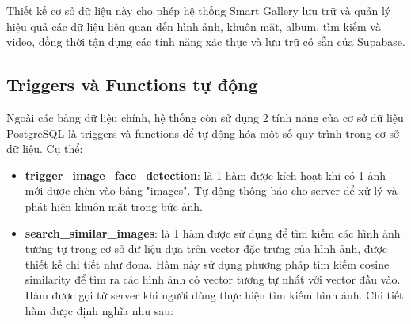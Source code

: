 Thiết kế cơ sở dữ liệu này cho phép hệ thống Smart Gallery lưu trữ và quản lý hiệu quả các dữ liệu liên quan đến hình ảnh, khuôn mặt, album, tìm kiếm và video, đồng thời tận dụng các tính năng xác thực và lưu trữ có sẵn của Supabase.

\subsection{Triggers và Functions tự động}

Ngoài các bảng dữ liệu chính, hệ thống còn sử dụng 2 tính năng của cơ sở dữ liệu PostgreSQL là triggers và functions để tự động hóa một số quy trình trong cơ sở dữ liệu. Cụ thể:
\begin{itemize}
    \item \textbf{trigger\_image\_face\_detection}: là 1 hàm được kích hoạt khi có 1 ảnh mới được chèn vào bảng "images". Tự động thông báo cho server để xử lý và phát hiện khuôn mặt trong bức ảnh.
    
    
    \item \textbf{search\_similar\_images}: là 1 hàm được sử dụng để tìm kiếm các hình ảnh tương tự trong cơ sở dữ liệu dựa trên vector đặc trưng của hình ảnh, được thiết kế chi tiết như đona. Hàm này sử dụng phương pháp tìm kiếm cosine similarity để tìm ra các hình ảnh có vector tương tự nhất với vector đầu vào. Hàm được gọi từ server khi người dùng thực hiện tìm kiếm hình ảnh.  Chi tiết hàm được định nghĩa như sau:
      
    
\end{itemize}

